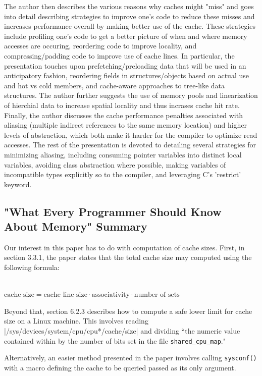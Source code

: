 \documentclass[12pt]{article}
\begin{document}
The author then describes the various reasons why caches might "miss" and goes into detail describing strategies to improve one's code to reduce these misses and increases performance overall by making better use of the cache. These strategies include profiling one's code to get a better picture of when and where memory accesses are occuring, reordering code to improve locality, and compressing/padding code to improve use of cache lines. In particular, the presentation touches upon prefetching/preloading data that will be used in an anticipatory fashion, reordering fields in structures/objects based on actual use and hot vs cold members, and cache-aware approaches to tree-like data structures. The author further suggests the use of memory pools and linearization of hierchial data to increase spatial locality and thus incrases cache hit rate. Finally, the author discusses the cache performance penalties associated with aliasing (multiple indirect references to the same memory location) and higher levels of abstraction, which both make it harder for the compiler to optimize read accesses. The rest of the presentation is devoted to detailing several strategies for minimizing aliasing, including consuming pointer variables into distinct local variables, avoiding class abstraction where possible, making variables of incompatible types explicitly so to the compiler, and leveraging C's 'restrict' keyword. 
\subsection*{"What Every Programmer Should Know About Memory" Summary}
Our interest in this paper has to do with computation of cache sizes. First, in section 3.3.1, the paper states that the total cache size may computed using the following formula:\\ \\
\begin{center}
$\textrm{cache size} = \textrm{cache line size} \cdot \textrm{associativity} \cdot \textrm{number of sets}$
\end{center}
\par Beyond that, section 6.2.3 describes how to compute a safe lower limit for cache size on a Linux machine. This involves reading\\ \spverb|/sys/devices/system/cpu/cpu*/cache/size| and dividing ``the numeric value contained within by the number of bits set in the file \verb!shared_cpu_map!." 
\par Alternatively, an easier method presented in the paper involves calling \verb!sysconf()! with a macro defining the cache to be queried passed as its only argument.
\end{document}

